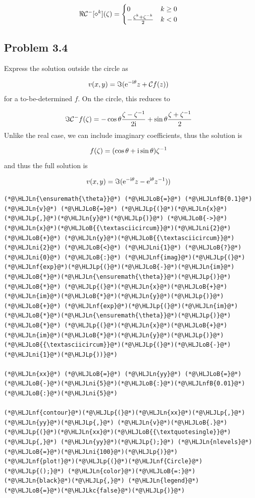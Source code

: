 \documentclass[12pt,a4paper]{article}
\newcommand{\HLJLkc}[1]{\textcolor[RGB]{59,151,46}{\textit{#1}}}
\newcommand{\HLJLn}[1]{#1}
\newcommand{\HLJLnf}[1]{\textcolor[RGB]{66,102,213}{#1}}
\newcommand{\HLJLnfB}[1]{\textcolor[RGB]{59,151,46}{#1}}
\newcommand{\HLJLni}[1]{\textcolor[RGB]{59,151,46}{#1}}
\newcommand{\HLJLoB}[1]{\textcolor[RGB]{102,102,102}{\textbf{#1}}}
\newcommand{\HLJLp}[1]{#1}
\def\I{ {\rm i} }
\def\E{ {\rm e} }
\def\CC{ {\cal C} }
\begin{document}
\[
\Re \CC^-[\diamond^k](\zeta) =\begin{cases}
0  & k \geq 0 \\
    -{\zeta^k + \zeta^{-k} \over 2} & k < 0
        \end{cases}
\]
\subsection{Problem 3.4}
Express the solution outside the circle as

\[
v(x,y) = \Im ( \E^{-\I \theta} z + \CC f(z))
\]
for a to-be-determined $f$. On the circle, this reduces to

\[
\Im \CC^- f(\zeta) = -\cos \theta {\zeta - \zeta^{-1} \over 2 \I}  + \sin \theta {\zeta + \zeta^{-1} \over 2}
\]
Unlike the real case, we can include imaginary coefficients, thus the solution is

\[
f(\zeta) = (\cos \theta + \I \sin \theta) \zeta^{-1}
\]
and thus the full solution is

\[
v(x,y) =  \Im ( \E^{-\I \theta} z - \E^{\I \theta}   z^{-1}))
\]

\begin{lstlisting}
(*@\HLJLn{\ensuremath{\theta}}@*) (*@\HLJLoB{=}@*) (*@\HLJLnfB{0.1}@*)
(*@\HLJLn{v}@*) (*@\HLJLoB{=}@*) (*@\HLJLp{(}@*)(*@\HLJLn{x}@*)(*@\HLJLp{,}@*)(*@\HLJLn{y}@*)(*@\HLJLp{)}@*) (*@\HLJLoB{->}@*) (*@\HLJLn{x}@*)(*@\HLJLoB{{\textasciicircum}}@*)(*@\HLJLni{2}@*) (*@\HLJLoB{+}@*) (*@\HLJLn{y}@*)(*@\HLJLoB{{\textasciicircum}}@*)(*@\HLJLni{2}@*) (*@\HLJLoB{<}@*) (*@\HLJLni{1}@*) (*@\HLJLoB{?}@*) (*@\HLJLni{0}@*) (*@\HLJLoB{:}@*) (*@\HLJLnf{imag}@*)(*@\HLJLp{(}@*)(*@\HLJLnf{exp}@*)(*@\HLJLp{(}@*)(*@\HLJLoB{-}@*)(*@\HLJLn{im}@*)(*@\HLJLoB{*}@*)(*@\HLJLn{\ensuremath{\theta}}@*)(*@\HLJLp{)}@*) (*@\HLJLoB{*}@*) (*@\HLJLp{(}@*)(*@\HLJLn{x}@*)(*@\HLJLoB{+}@*)(*@\HLJLn{im}@*)(*@\HLJLoB{*}@*)(*@\HLJLn{y}@*)(*@\HLJLp{)}@*) (*@\HLJLoB{+}@*) (*@\HLJLnf{exp}@*)(*@\HLJLp{(}@*)(*@\HLJLn{im}@*)(*@\HLJLoB{*}@*)(*@\HLJLn{\ensuremath{\theta}}@*)(*@\HLJLp{)}@*) (*@\HLJLoB{*}@*) (*@\HLJLp{(}@*)(*@\HLJLn{x}@*)(*@\HLJLoB{+}@*)(*@\HLJLn{im}@*)(*@\HLJLoB{*}@*)(*@\HLJLn{y}@*)(*@\HLJLp{)}@*)(*@\HLJLoB{{\textasciicircum}}@*)(*@\HLJLp{(}@*)(*@\HLJLoB{-}@*)(*@\HLJLni{1}@*)(*@\HLJLp{))}@*)

(*@\HLJLn{xx}@*) (*@\HLJLoB{=}@*) (*@\HLJLn{yy}@*) (*@\HLJLoB{=}@*) (*@\HLJLoB{-}@*)(*@\HLJLni{5}@*)(*@\HLJLoB{:}@*)(*@\HLJLnfB{0.01}@*)(*@\HLJLoB{:}@*)(*@\HLJLni{5}@*)

(*@\HLJLnf{contour}@*)(*@\HLJLp{(}@*)(*@\HLJLn{xx}@*)(*@\HLJLp{,}@*) (*@\HLJLn{yy}@*)(*@\HLJLp{,}@*) (*@\HLJLn{v}@*)(*@\HLJLoB{.}@*)(*@\HLJLp{(}@*)(*@\HLJLn{xx}@*)(*@\HLJLoB{{\textquotesingle}}@*)(*@\HLJLp{,}@*) (*@\HLJLn{yy}@*)(*@\HLJLp{);}@*) (*@\HLJLn{nlevels}@*)(*@\HLJLoB{=}@*)(*@\HLJLni{100}@*)(*@\HLJLp{)}@*)
(*@\HLJLnf{plot!}@*)(*@\HLJLp{(}@*)(*@\HLJLnf{Circle}@*)(*@\HLJLp{();}@*) (*@\HLJLn{color}@*)(*@\HLJLoB{=:}@*)(*@\HLJLn{black}@*)(*@\HLJLp{,}@*) (*@\HLJLn{legend}@*)(*@\HLJLoB{=}@*)(*@\HLJLkc{false}@*)(*@\HLJLp{)}@*)
\end{lstlisting}
\end{document}
